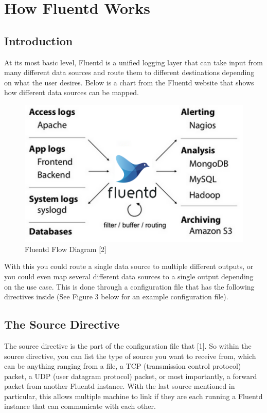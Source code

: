 \documentclass{article}
\begin{document}
\section{How Fluentd Works} \label{sec:works}
\subsection{Introduction}
\quad \quad 
At its most basic level, Fluentd is a unified logging layer that can take input from many different
data sources and route them to different destinations depending on what the user desires. Below is a chart
from the Fluentd website that shows how different data sources can be mapped.
\begin{figure}[H]
    \centering
    \includegraphics[scale=0.75]{images/Fluentd-architecture.png}
    \caption{Fluentd Flow Diagram [2]}
    \label{fig:pic1}
\end{figure}
With this you could route a single data source to multiple different outputs, or you could even map several different data sources to a single output depending on the use case. This is done 
through a configuration file that has the following directives inside (See Figure 3 below for an example configuration file).
\subsection{The Source Directive}
\quad \quad The source directive is the part of the configuration file that [1]. So within
the source directive, you can list the type of source you want to receive from, which can be anything ranging from a file, a TCP (transmission control protocol) packet,
a UDP (user datagram protocol) packet, or most importantly, a forward packet from another Fluentd instance. With the last source mentioned in
particular, this allows multiple machine to link if they are each running a Fluentd instance that can communicate with
each other.
\end{document}
